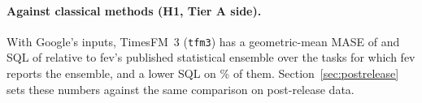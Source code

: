 \paragraph{Against classical methods (H1, Tier A side).} With Google's inputs, TimesFM~3 (\texttt{tfm3}) has a geometric-mean
MASE of \HoneAMase{} and SQL of \HoneASql{} relative to fev's published statistical ensemble over the \HoneATasks{} tasks for which fev reports the ensemble, and a lower
SQL on \HoneAWins\% of them. Section~\ref{sec:postrelease} sets these numbers against the same comparison on post-release data.
